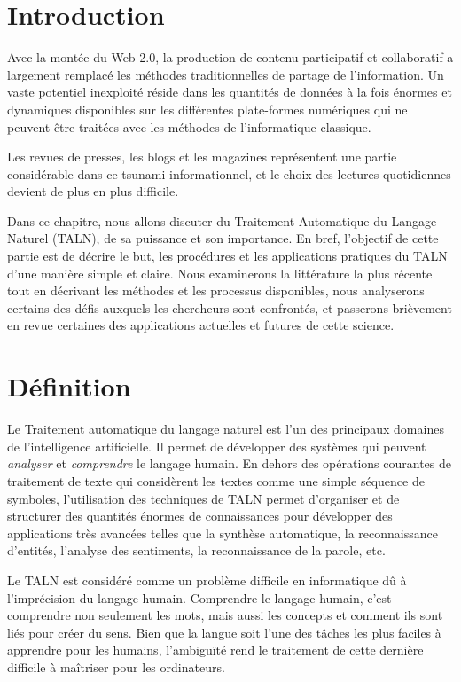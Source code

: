 
\newpage
\section{Introduction}
Avec la montée du Web 2.0, la production de contenu participatif et collaboratif a largement remplacé les méthodes traditionnelles de partage de l'information. Un vaste potentiel inexploité réside dans les quantités de données à la fois énormes et dynamiques disponibles sur les différentes plate-formes numériques qui ne peuvent être traitées avec les méthodes de l'informatique classique.

Les revues de presses, les blogs et les magazines représentent une partie considérable dans ce tsunami informationnel, et le choix des lectures quotidiennes devient de plus en plus difficile.

Dans ce chapitre, nous allons discuter du Traitement Automatique du Langage Naturel (TALN), de sa puissance et son importance. En bref, l'objectif de cette partie est de décrire le but, les procédures et les applications pratiques du TALN d'une manière simple et claire. Nous examinerons la littérature la plus récente tout en décrivant les méthodes et les processus disponibles, nous analyserons certains des défis auxquels les chercheurs sont confrontés, et passerons brièvement en revue certaines des applications actuelles et futures de cette science.

\section{Définition}
Le Traitement automatique du langage naturel est l'un des principaux domaines de l'intelligence artificielle. Il permet de développer des systèmes qui peuvent \emph{analyser} et \emph{comprendre} le langage humain. En dehors des opérations courantes de traitement de texte qui considèrent les textes comme une simple séquence de symboles, l'utilisation des techniques de TALN permet d'organiser et de structurer des quantités énormes de connaissances pour développer des applications très avancées telles que la synthèse automatique, la reconnaissance d'entités, l'analyse des sentiments, la reconnaissance de la parole, etc.

Le TALN est considéré comme un problème difficile en informatique dû à l'imprécision du langage humain. Comprendre le langage humain, c'est comprendre non seulement les mots, mais aussi les concepts et comment ils sont liés pour créer du sens. Bien que la langue soit l'une des tâches les plus faciles à apprendre pour les humains, l'ambiguïté rend le traitement de cette dernière difficile à maîtriser pour les ordinateurs.

